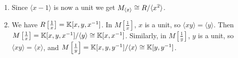 \documentclass[Notebook.tex]{subfiles}
\begin{document}
\begin{solution}
\begin{enumerate}
        \item Since $\langle x - 1 \rangle$ is now a unit we get $M_{\langle x \rangle} \cong R / \langle x^2 \rangle$. 
        
        \item We have $R\left[\frac{1}{x}\right] = \mathbb K[x, y, x^{-1}]$. In $M\left[\frac{1}{x}\right]$, $x$ is a unit, so $\langle xy \rangle = \langle y \rangle$. Then $M\left[\frac{1}{x}\right] = \mathbb K[x, y , x^{-1}] / \langle y \rangle \cong \mathbb K[x, x^{-1}]$. Similarly, in $M\left[\frac{1}{y}\right]$, $y$ is a unit, so $\langle xy \rangle = \langle x \rangle$, and $M\left[\frac{1}{y}\right] = \mathbb K[x, y , y^{-1}] / \langle x \rangle \cong \mathbb K[y, y^{-1}]$. 
    \end{enumerate}
\end{solution}
\end{document}
